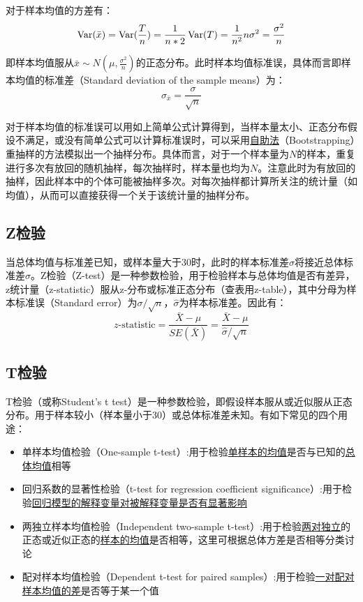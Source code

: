 \documentclass[11pt]{article}
\begin{document}
对于样本均值的方差有：
\begin{equation*}
    \operatorname{Var}(\bar{x}) = \operatorname{Var}(\frac{T}{n}) = \frac{1}{n*2} \operatorname{Var}(T) = \frac{1}{n^2} n\sigma^2 = \frac{\sigma^2}{n}
\end{equation*}

即样本均值服从$\bar{x}\sim N(\mu,\frac{\sigma^2}{n})$的正态分布。此时样本均值标准误，具体而言即样本均值的标准差（Standard deviation of the sample means）为：
\begin{equation*}
    \sigma_{\bar{x}} = \frac{\sigma}{\sqrt{n}}
\end{equation*}

对于样本均值的标准误可以用如上简单公式计算得到，当样本量太小、正态分布假设不满足，或没有简单公式可以计算标准误时，可以采用\uline{自助法}（Bootstrapping）重抽样的方法模拟出一个抽样分布。具体而言，对于一个样本量为$N$的样本，重复进行多次有放回的随机抽样，每次抽样时，样本量也均为$N$。注意此时为有放回的抽样，因此样本中的个体可能被抽样多次。对每次抽样都计算所关注的统计量（如均值），从而可以直接获得一个关于该统计量的抽样分布。

\subsection{Z检验}

当总体均值与标准差已知，或样本量大于30时，此时的样本标准差$\hat{\sigma}$将接近总体标准差$\sigma$。Z检验（Z-test）是一种参数检验，用于检验样本与总体均值是否有差异，z统计量（z-statistic）服从z-分布或标准正态分布（查表用z-table），其中分母为样本标准误（Standard error）为$\sigma/\sqrt{n}$，$\hat{\sigma}$为样本标准差。因此有：
\begin{equation*}
    z\text{-statistic} = \frac{\bar{X}-\mu}{SE(\bar{X})} = \frac{\bar{X} - \mu}{\hat{\sigma}/\sqrt{n}}
\end{equation*}

\subsection{T检验}

T检验（或称Student's t test）是一种参数检验，即假设样本服从或近似服从正态分布。用于样本较小（样本量小于30）或总体标准差未知。有如下常见的四个用途：
\begin{itemize}
    \item 单样本均值检验（One-sample t-test）:用于检验\uline{单样本的均值}是否与已知的\uline{总体均值}相等
    \item 回归系数的显著性检验（t-test for regression coefficient significance）:用于检验\uline{回归模型的解释变量对被解释变量是否有显著影响}
    \item 两独立样本均值检验（Independent two-sample t-test）:用于检验\uline{两对独立}的正态或近似正态的\uline{样本的均值}是否相等，这里可根据总体方差是否相等分类讨论
    \item 配对样本均值检验（Dependent t-test for paired samples）:用于检验\uline{一对配对样本均值的差}是否等于某一个值
\end{itemize}
\end{document}
